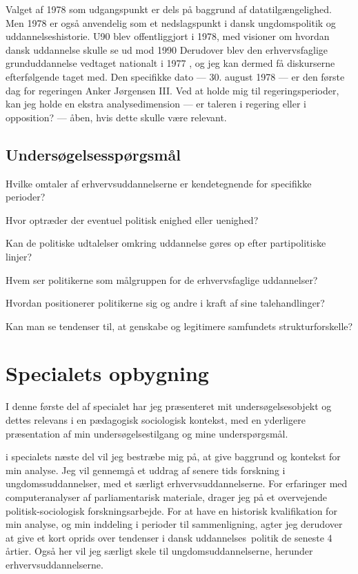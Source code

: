 Valget af 1978 som udgangspunkt er dels på baggrund af datatilgængelighed.
Men 1978 er også anvendelig som et nedslagspunkt i dansk ungdomspolitik og uddannelseshistorie.
U90 blev offentliggjort i 1978, med visioner om hvordan dansk uddannelse skulle se ud mod 1990 \autocite{undervisningsministeriet90SamletUddannelsesplanlaegning1978undervisningsministerietSpecialundervisning2019}
Derudover blev den erhvervsfaglige grunduddannelse vedtaget nationalt i 1977 \autocite{thewikipediavolunteersEFG2019}, og jeg kan dermed få diskurserne efterfølgende taget med.
Den specifikke dato — 30. august 1978 — er den første dag for regeringen Anker Jørgensen III.
Ved at holde mig til regeringsperioder, kan jeg holde en ekstra analysedimension — er taleren i regering eller i opposition? — åben, hvis dette skulle være relevant.

\section{Undersøgelsesspørgsmål}\label{seq:resqs}

Hvilke omtaler af erhvervsuddannelserne er kendetegnende for specifikke perioder?

Hvor optræder der eventuel politisk enighed eller uenighed?

Kan de politiske udtalelser omkring uddannelse gøres op efter partipolitiske linjer?

Hvem ser politikerne som målgruppen for de erhvervsfaglige uddannelser?

Hvordan positionerer politikerne sig og andre i kraft af sine talehandlinger?

Kan man se tendenser til, at genskabe og legitimere samfundets strukturforskelle?

\chapter{Specialets opbygning}
I denne første del af specialet har jeg præsenteret mit undersøgelsesobjekt og dettes relevans i en pædagogisk sociologisk kontekst, med en yderligere præsentation af min undersøgelsestilgang og mine underspørgsmål.

i specialets næste del vil jeg bestræbe mig på, at give baggrund og kontekst for min analyse.
Jeg vil gennemgå et uddrag af senere tids forskning i ungdomssuddannelser, med et særligt erhvervsuddannelserne.
For erfaringer med computeranalyser af parliamentarisk materiale, drager jeg på et overvejende politisk-sociologisk forskningsarbejde.
For at have en historisk kvalifikation for min analyse, og min inddeling i perioder til sammenligning, agter jeg derudover at give et kort oprids over tendenser i dansk uddannelses\ politik de seneste 4 årtier.
Også her vil jeg særligt skele til ungdomsuddannelserne, herunder erhvervsuddannelserne.

